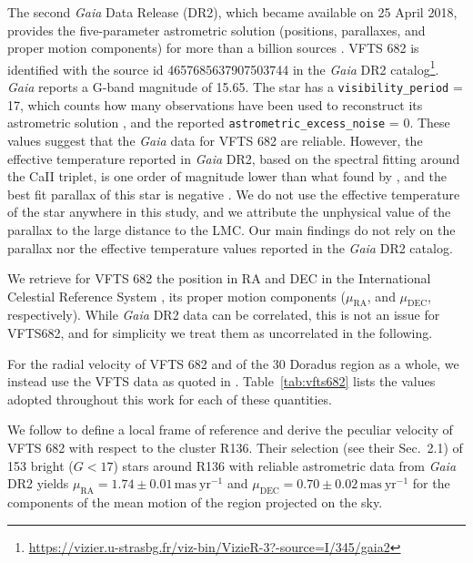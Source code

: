 \documentclass[a4paper,fleqn,usenatbib]{mnras}
\DeclareRobustCommand{\Tabref}[1]{Table~\ref{#1}}
\begin{document}
The second \emph{Gaia} Data Release (DR2), which became available on 25 April 2018,
provides the five-parameter astrometric solution (positions,
parallaxes, and proper motion components) for more than a billion
sources \citep{brown:18}. VFTS 682 is identified with the source id 4657685637907503744 in the \emph{Gaia} DR2
catalog\footnote{\url{https://vizier.u-strasbg.fr/viz-bin/VizieR-3?-source=I/345/gaia2}}. \emph{Gaia}
reports a G-band magnitude of 15.65. The star has a
\texttt{visibility\_period} = 17, which counts how many observations have
been used to reconstruct its astrometric solution
\citep[][]{lindengren:18}, and the reported
\texttt{astrometric\_excess\_noise} = 0. These values suggest that the \emph{Gaia}
data for VFTS 682 are reliable. However, the effective temperature
reported in \emph{Gaia} DR2, based on the spectral fitting around the
CaII triplet, is one order of magnitude lower than what found by
\cite{bestenlehner:11}, and the best fit parallax of this star is
negative \citep[see, e.g.,][]{hogg:18}. We do not use the effective temperature of the star anywhere
in this study, and we attribute the unphysical value of the parallax
to the large distance to the LMC. Our main findings do not rely on the
parallax nor the effective temperature values reported in the \emph{Gaia} DR2
catalog.

We retrieve for VFTS 682 the position in RA and DEC
in the International Celestial Reference System \cite[][]{brown:18}, its
proper motion components ($\mu_\mathrm{RA}$, and $\mu_\mathrm{DEC}$,
respectively). While \emph{Gaia} DR2 data can be correlated, this is
not an issue for VFTS682, and for simplicity we treat them as
uncorrelated in the following.

For the radial velocity of VFTS 682 and of the 30 Doradus
region as a whole, we instead use the VFTS data
as quoted in \cite{bestenlehner:11}. \Tabref{tab:vfts682} lists the values adopted throughout
this work for each of these quantities.

We follow \citet{lennon:18} to define a local frame of reference and derive the peculiar velocity
of VFTS 682 with respect to the cluster R136. Their selection (see
their Sec.~2.1) of 153
bright ($G<17$) stars around R136 with reliable astrometric data from
\emph{Gaia} DR2 yields $\mu_\mathrm{RA}=1.74\pm0.01\,\mathrm{mas\
  yr^{-1}}$ and $\mu_\mathrm{DEC}=0.70\pm0.02\,\mathrm{mas\ yr^{-1}}$
for the components of the mean motion of the region projected on the sky.
\end{document}
